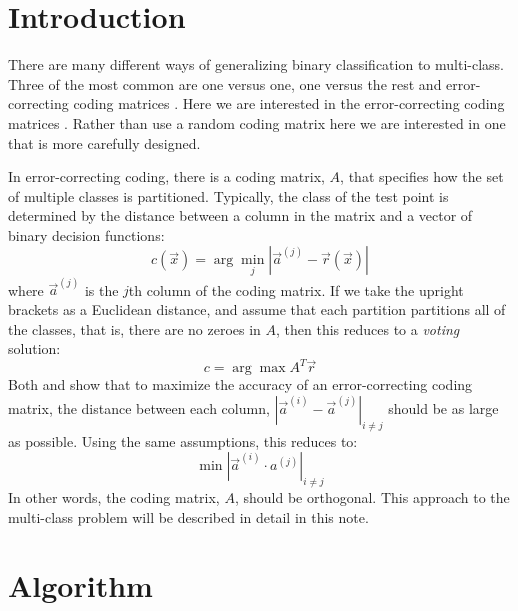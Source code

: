 \documentclass{article}
\begin{document}
\section{Introduction}

There are many different ways of generalizing binary classification to 
multi-class.
Three of the most common are one versus one, one versus the rest and 
error-correcting coding matrices \citep{Hsu_Lin2002}.
Here we are interested in the error-correcting coding matrices
\citep{Dietterich_Bakiri1995, Windeatt_Ghaderi2002}.
Rather than use a random coding matrix here we are interested in one that is
more carefully designed.

In error-correcting coding, there is a coding matrix, $A$, that specifies
how the set of multiple classes is partitioned.
Typically, the class of the test point is determined by the distance between
a column in the matrix and a vector of binary decision functions:
\begin{equation}
	c(\vec x) = \arg \min_j | \vec a^{(j)} - \vec r(\vec x) |
\end{equation}
where $\vec a^{(j)}$ is the $j$th column of the coding matrix.
If we take the upright brackets as a Euclidean distance, and assume that
each partition partitions all of the classes, that is, there are no zeroes
in $A$, then this reduces to a {\it voting} solution:
\begin{equation}
	c = \arg \max A^T \vec r \label{voting}
\end{equation}
Both \citet{Allwein_etal2000} and \citet{Windeatt_Ghaderi2002} show that to
maximize the accuracy of an error-correcting coding matrix, the distance
between each column, $|\vec a^{(i)} - \vec a^{(j)}|_{i \ne j}$ should be as
large as possible.
Using the same assumptions, this reduces to:
\begin{equation}
	\min |\vec a^{(i)} \cdot a^{(j)}|_{i \ne j}
\end{equation}
In other words, the coding matrix, $A$, should be orthogonal.
This approach to the multi-class problem will be described in detail in this note.

\section{Algorithm}
\end{document}
